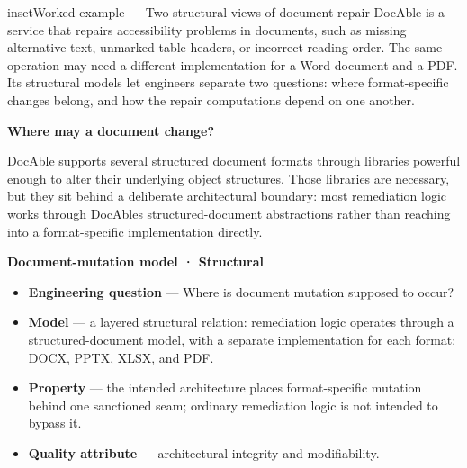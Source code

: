 \begin{bookbox}{inset}{Worked example --- Two structural views of document repair}
\label{inset-docable-structural}
DocAble is a service that repairs accessibility problems in documents, such as missing alternative text, unmarked table headers, or incorrect reading order. The same operation may need a different implementation for a Word document and a PDF. Its structural models let engineers separate two questions: where format-specific changes belong, and how the repair computations depend on one another.

\textbf{Where may a document change?}

DocAble supports several structured document formats through libraries powerful enough to alter their underlying object structures. Those libraries are necessary, but they sit behind a deliberate architectural boundary: most remediation logic works through DocAble\textquotesingle s structured-document abstractions rather than reaching into a format-specific implementation directly.

\textbf{Document-mutation model · Structural}

\begin{itemize}
\tightlist
\item
  \textbf{Engineering question} --- Where is document mutation supposed to occur?
\end{itemize}

\begin{itemize}
\tightlist
\item
  \textbf{Model} --- a layered structural relation: remediation logic operates through a structured-document model, with a separate implementation for each format: DOCX, PPTX, XLSX, and PDF.
\end{itemize}

\begin{itemize}
\tightlist
\item
  \textbf{Property} --- the intended architecture places format-specific mutation behind one sanctioned seam; ordinary remediation logic is not intended to bypass it.
\end{itemize}

\begin{itemize}
\tightlist
\item
  \textbf{Quality attribute} --- architectural integrity and modifiability.
\end{itemize}



\end{bookbox}
